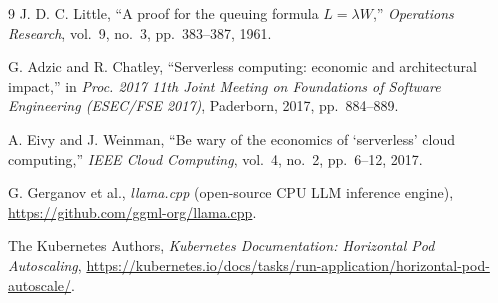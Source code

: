 \documentclass[conference]{IEEEtran}
\begin{document}
\begin{thebibliography}{9}\small
{} J. D. C. Little, ``A proof for the queuing formula
$L=\lambda W$,'' \emph{Operations Research}, vol.~9, no.~3, pp.~383--387, 1961.

 G. Adzic and R. Chatley, ``Serverless computing: economic
and architectural impact,'' in \emph{Proc. 2017 11th Joint Meeting on
Foundations of Software Engineering (ESEC/FSE 2017)}, Paderborn, 2017,
pp.~884--889.

 A. Eivy and J. Weinman, ``Be wary of the economics of
`serverless' cloud computing,'' \emph{IEEE Cloud Computing}, vol.~4, no.~2,
pp.~6--12, 2017.

 G. Gerganov et al., \emph{llama.cpp} (open-source CPU LLM
inference engine), \url{https://github.com/ggml-org/llama.cpp}.

 The Kubernetes Authors, \emph{Kubernetes Documentation:
Horizontal Pod Autoscaling},
\url{https://kubernetes.io/docs/tasks/run-application/horizontal-pod-autoscale/}.
\end{thebibliography}
\end{document}
